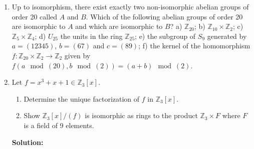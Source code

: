 \documentclass{article}
\newif\ifanswers
\begin{document}
\begin{enumerate}
\item Up to isomorphism, there exist exactly two non-isomorphic abelian groups of order 20
called $A$ and $B$. Which of the following abelian groups of order 20 are isomorphic to $A$
and which are isomorphic to $B$? a) $\mathbb{Z}_{20}$; b) $\mathbb{Z}_{10} \times 
\mathbb{Z}_2$; c) $\mathbb{Z}_5 \times \mathbb{Z}_4$; d) $U_{25}$ the units in the ring 
$\mathbb{Z}_{25}$; e) the subgroup of $S_9$ generated by $a = (12345)$, $b = (67)$ and 
$c = (89)$; f) the kernel of the homomorphism $f \colon \mathbb{Z}_{20} \times 
\mathbb{Z}_2 \to \mathbb{Z}_2$ given by $f(a \mod{(20)}, b \mod{(2)}) = (a + b) \mod{(2)}$.
\newline
\ifanswers
\textbf{Solution:}
Suppose $A$ is cyclic and $B$ is not cyclic. Then $A$ is isomorphic to a) [by definition], c)
[because 4 and 5 are relatively prime], and d) [because 25 is the power of an odd prime]. Next, 
$B$ is isomorphic to b) [because 10 and 2 are not relatively prime], e) 
[because this subgroup is isomorphic to $\mathbb{Z}_5 \times \mathbb{Z}_2 \times 
\mathbb{Z}_2$, which is not cyclic] and f) [because the kernel is all tuples $(x, y)$ such 
that $x$ and $y$ have the same parity in their respective groups, which is isomorphic to 
$\mathbb{Z}_{10} \times \mathbb{Z}_2$].
\fi

\item Let $f = x^3 + x + 1 \in \mathbb{Z}_3[x]$.
\begin{enumerate}[label=(\arabic*)]
	\item Determine the unique factorization of $f$ in $\mathbb{Z}_3[x]$.
	\item Show $\mathbb{Z}_3[x]/(f)$ is isomorphic as rings to the product $\mathbb{Z}_3
	\times F$ where $F$ is a field of 9 elements.
\end{enumerate}
\ifanswers
\textbf{Solution:}


\end{enumerate}
\end{document}
